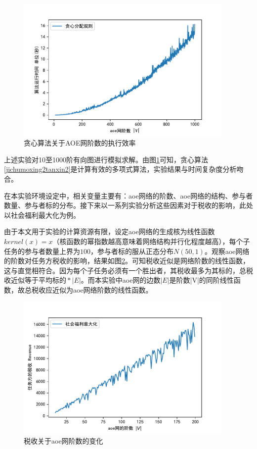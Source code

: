 \documentclass[promaster]{thesis-uestc}
\begin{document}
\begin{figure}[H]
    \includegraphics[width=300pt]{exp/exetime.pdf}
    \caption{贪心算法关于AOE网阶数的执行效率}
    \label{exetime}
\end{figure}

上述实验对10至1000阶有向图进行模拟求解。由图\ref{exetime}可知，贪心算法\ref{jichumoxing2tanxin2}是计算有效的多项式算法，实验结果与时间复杂度分析吻合。

在本实验环境设定中，相关变量主要有：aoe网络的阶数、aoe网络的结构、参与者数量、参与者标的分布。接下来以一系列实验分析这些因素对于税收的影响，此处以社会福利最大化为例。

由于本文用于实验的计算资源有限，设定aoe网络的生成核为线性函数$kernel(x)=x$（核函数的幂指数越高意味着网络结构并行化程度越高），每个子任务的参与者数量上界为$100$，参与者标的服从正态分布$N(50,1)$。观察aoe网络的阶数对任务方税收的影响，结果如图\ref{revenuevsv}。可知税收近似是网络阶数的线性函数，这与直觉相符合。因为每个子任务必须有一个胜出者，其税收最多为其标的，总税收近似等于$\text{平均标的}*|E|$。而本实验中aoe网的边数$|E|$是阶数|V|的同阶线性函数，故总税收应近似为aoe网络阶数的线性函数。

\begin{figure}[H]
    \includegraphics[width=300pt]{exp/revenuevsv.pdf}
    \caption{税收关于aoe网阶数的变化}
    \label{revenuevsv}
\end{figure}
\end{document}
